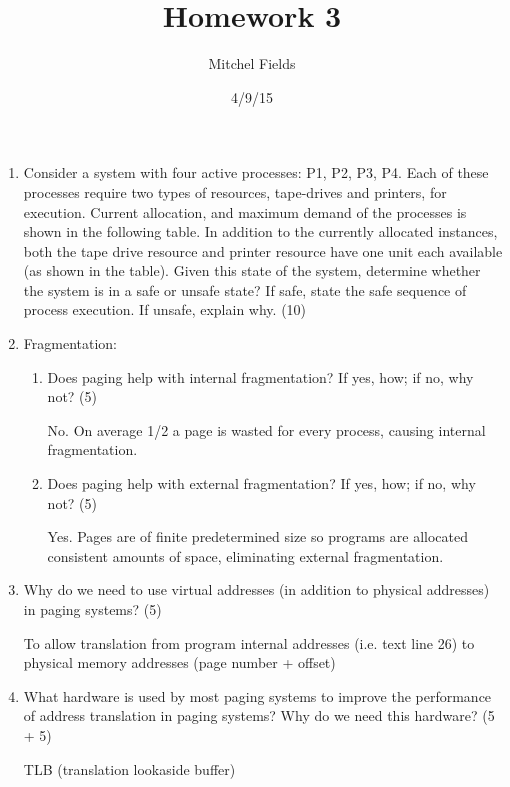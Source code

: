 \documentclass{article}
\begin{document}
\title{Homework 3}
\author{Mitchel Fields}
\date{4/9/15}
\maketitle

\begin{enumerate}

\item Consider a system with four active processes: P1, P2, P3, P4. Each of these processes require two types of resources, tape-drives and printers, for execution. Current allocation, and maximum demand of the processes is shown in the following table. In addition to the currently allocated instances, both the tape drive resource and printer resource have one unit each available (as shown in the table). Given this state of the system, determine whether the system is in a safe or unsafe state? If safe, state the safe sequence of process execution. If unsafe, explain why. (10)



\item Fragmentation:
\begin{enumerate}
\renewcommand{\theenumi}{\Alph{enumi}}
\item Does paging help with internal fragmentation? If yes, how; if no, why not? (5)

No. On average 1/2 a page is wasted for every process, causing internal fragmentation.

\item Does paging help with external fragmentation? If yes, how; if no, why not? (5)

Yes. Pages are of finite predetermined size so programs are allocated consistent amounts of space, eliminating external fragmentation.
\end{enumerate}

\item Why do we need to use virtual addresses (in addition to physical addresses) in paging systems? (5)

To allow translation from program internal addresses (i.e. text line 26) to physical memory addresses (page number + offset)

\item What hardware is used by most paging systems to improve the performance of address translation in paging systems? Why do we need this hardware? (5 + 5)

TLB (translation lookaside buffer)


\end{enumerate}
\end{document}
